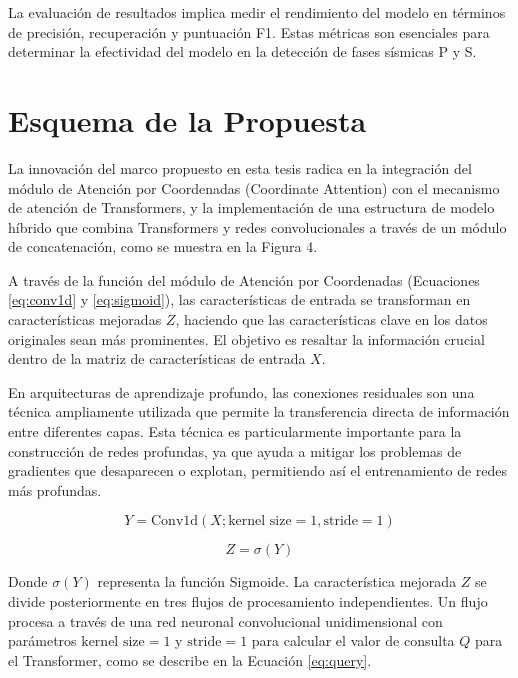 La evaluación de resultados implica medir el rendimiento del modelo en términos de precisión, recuperación y puntuación F1. Estas métricas son esenciales para determinar la efectividad del modelo en la detección de fases sísmicas P y S.

\section{Esquema de la Propuesta}

La innovación del marco propuesto en esta tesis radica en la integración del módulo de Atención por Coordenadas (Coordinate Attention) con el mecanismo de atención de Transformers, y la implementación de una estructura de modelo híbrido que combina Transformers y redes convolucionales a través de un módulo de concatenación, como se muestra en la Figura 4. 

A través de la función del módulo de Atención por Coordenadas (Ecuaciones \ref{eq:conv1d} y \ref{eq:sigmoid}), las características de entrada se transforman en características mejoradas $Z$, haciendo que las características clave en los datos originales sean más prominentes. El objetivo es resaltar la información crucial dentro de la matriz de características de entrada $X$. 

En arquitecturas de aprendizaje profundo, las conexiones residuales son una técnica ampliamente utilizada que permite la transferencia directa de información entre diferentes capas. Esta técnica es particularmente importante para la construcción de redes profundas, ya que ayuda a mitigar los problemas de gradientes que desaparecen o explotan, permitiendo así el entrenamiento de redes más profundas.

\begin{equation}
Y = \text{Conv1d}(X; \text{kernel size} = 1, \text{stride} = 1)
\label{eq:conv1d}
\end{equation}

\begin{equation}
Z = \sigma(Y)
\label{eq:sigmoid}
\end{equation}

Donde $\sigma(Y)$ representa la función Sigmoide. La característica mejorada $Z$ se divide posteriormente en tres flujos de procesamiento independientes. Un flujo procesa a través de una red neuronal convolucional unidimensional con parámetros $\text{kernel size} = 1$ y $\text{stride} = 1$ para calcular el valor de consulta $Q$ para el Transformer, como se describe en la Ecuación \ref{eq:query}.

